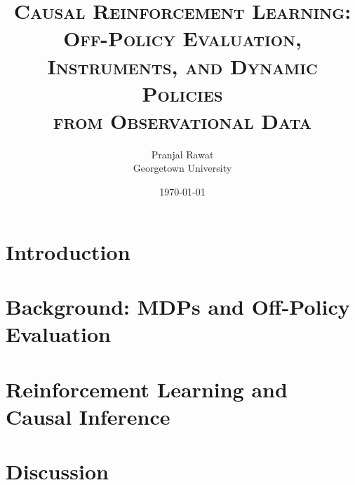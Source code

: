 




\title{\textsc{Causal Reinforcement Learning:\\ Off-Policy Evaluation, Instruments, and Dynamic Policies\\ from Observational Data}}
\author{Pranjal Rawat \\ Georgetown University}
\date{\today}

\maketitle

\begin{abstract}
\noindent
\end{abstract}

\tableofcontents
\newpage

\section{Introduction}\label{section:intro}

\section{Background: MDPs and Off-Policy Evaluation}\label{section:rl_background}

\section{Reinforcement Learning and Causal Inference}\label{section:causal_rl}


\section{Discussion}\label{section:conclusion}





